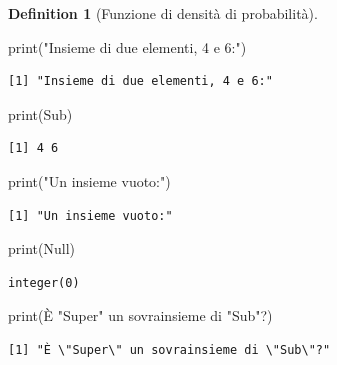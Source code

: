 \documentclass[
  letterpaper,
  DIV=11,
  numbers=noendperiod,
  oneside]{scrreprt}
\newenvironment{Shaded}{\begin{snugshade}}{\end{snugshade}}
\newcommand{\FunctionTok}[1]{\textcolor[rgb]{0.28,0.35,0.67}{#1}}
\newcommand{\NormalTok}[1]{\textcolor[rgb]{0.00,0.23,0.31}{#1}}
\newcommand{\StringTok}[1]{\textcolor[rgb]{0.13,0.47,0.30}{#1}}
\theoremstyle{definition}
\theoremstyle{plain}
\theoremstyle{definition}
\newtheorem{definition}{Definition}[chapter]
\theoremstyle{remark}
\begin{document}
\begin{definition}[Funzione di densità di
probabilità]
\begin{Shaded}
\begin{Highlighting}[]
\FunctionTok{print}\NormalTok{(}\StringTok{"Insieme di due elementi, 4 e 6:"}\NormalTok{)}
\end{Highlighting}
\end{Shaded}

\begin{verbatim}
[1] "Insieme di due elementi, 4 e 6:"
\end{verbatim}

\begin{Shaded}
\begin{Highlighting}[]
\FunctionTok{print}\NormalTok{(Sub)}
\end{Highlighting}
\end{Shaded}

\begin{verbatim}
[1] 4 6
\end{verbatim}

\begin{Shaded}
\begin{Highlighting}[]
\FunctionTok{print}\NormalTok{(}\StringTok{"Un insieme vuoto:"}\NormalTok{)}
\end{Highlighting}
\end{Shaded}

\begin{verbatim}
[1] "Un insieme vuoto:"
\end{verbatim}

\begin{Shaded}
\begin{Highlighting}[]
\FunctionTok{print}\NormalTok{(Null)}
\end{Highlighting}
\end{Shaded}

\begin{verbatim}
integer(0)
\end{verbatim}

\begin{Shaded}
\begin{Highlighting}[]
\FunctionTok{print}\NormalTok{(}\StringTok{\textquotesingle{}È "Super" un sovrainsieme di "Sub"?\textquotesingle{}}\NormalTok{)}
\end{Highlighting}
\end{Shaded}

\begin{verbatim}
[1] "È \"Super\" un sovrainsieme di \"Sub\"?"
\end{verbatim}


\end{definition}
\end{document}
